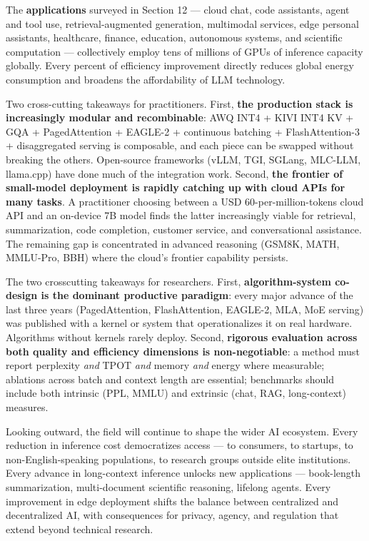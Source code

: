 \documentclass{article}
\begin{document}
The \textbf{applications} surveyed in Section 12 --- cloud chat, code assistants, agent and tool use, retrieval-augmented generation, multimodal services, edge personal assistants, healthcare, finance, education, autonomous systems, and scientific computation --- collectively employ tens of millions of GPUs of inference capacity globally. Every percent of efficiency improvement directly reduces global energy consumption and broadens the affordability of LLM technology.

Two cross-cutting takeaways for practitioners. First, \textbf{the production stack is increasingly modular and recombinable}: AWQ INT4 + KIVI INT4 KV + GQA + PagedAttention + EAGLE-2 + continuous batching + FlashAttention-3 + disaggregated serving is composable, and each piece can be swapped without breaking the others. Open-source frameworks (vLLM, TGI, SGLang, MLC-LLM, llama.cpp) have done much of the integration work. Second, \textbf{the frontier of small-model deployment is rapidly catching up with cloud APIs for many tasks}. A practitioner choosing between a USD 60-per-million-tokens cloud API and an on-device 7B model finds the latter increasingly viable for retrieval, summarization, code completion, customer service, and conversational assistance. The remaining gap is concentrated in advanced reasoning (GSM8K, MATH, MMLU-Pro, BBH) where the cloud's frontier capability persists.

The two crosscutting takeaways for researchers. First, \textbf{algorithm-system co-design is the dominant productive paradigm}: every major advance of the last three years (PagedAttention, FlashAttention, EAGLE-2, MLA, MoE serving) was published with a kernel or system that operationalizes it on real hardware. Algorithms without kernels rarely deploy. Second, \textbf{rigorous evaluation across both quality and efficiency dimensions is non-negotiable}: a method must report perplexity \emph{and} TPOT \emph{and} memory \emph{and} energy where measurable; ablations across batch and context length are essential; benchmarks should include both intrinsic (PPL, MMLU) and extrinsic (chat, RAG, long-context) measures.

Looking outward, the field will continue to shape the wider AI ecosystem. Every reduction in inference cost democratizes access --- to consumers, to startups, to non-English-speaking populations, to research groups outside elite institutions. Every advance in long-context inference unlocks new applications --- book-length summarization, multi-document scientific reasoning, lifelong agents. Every improvement in edge deployment shifts the balance between centralized and decentralized AI, with consequences for privacy, agency, and regulation that extend beyond technical research.
\end{document}
